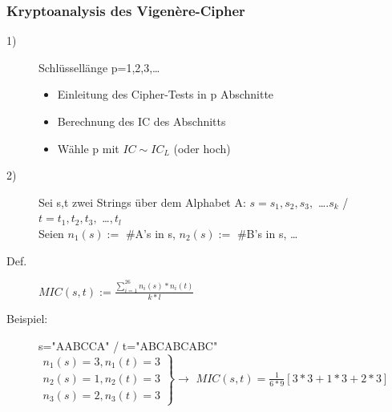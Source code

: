 \documentclass[10pt]{article}
\newcommand{\ra}{\rightarrow}
\newcommand{\Brackar}[2]{\left.\begin{array}{#1} #2 \end{array}\right\rbrace} %
\begin{document}
\subsubsection{Kryptoanalysis des Vigen\`{e}re-Cipher}
\begin{description}
	\item[1)] Schlüssellänge p=1,2,3,\dots
		\begin{itemize}
			\item Einleitung des Cipher-Tests in p Abschnitte
			\item Berechnung des IC des Abschnitts
			\item Wähle p mit $IC\sim IC_L$ (oder hoch)
		\end{itemize}
	\item[2)] Sei s,t zwei  Strings über dem Alphabet A: $s=s_1,s_2,s_3,$ \dots$. s_k$ / $t=t_1,t_2,t_3,$ \dots$, t_l$ \\
		Seien $n_1(s) :=$ \#A's in s, $n_2(s) :=$ \#B's in s, \dots
	\item[Def.] $MIC(s,t):=\frac{\sum_{i=1}^{26}n_i(s)*n_i(t)}{k*l}$
	\item[Beispiel:] s="{}AABCCA" / t="{}ABCABCABC" \\
		$\Brackar{l}{ n_1(s)=3, n_1(t)=3 \\ n_2(s)=1, n_2(t)=3 \\ n_3(s)=2, n_3(t)=3} \ra$ $MIC(s,t)=\frac{1}{6*9}[3*3+1*3+2*3]$


\end{description}
\end{document}
